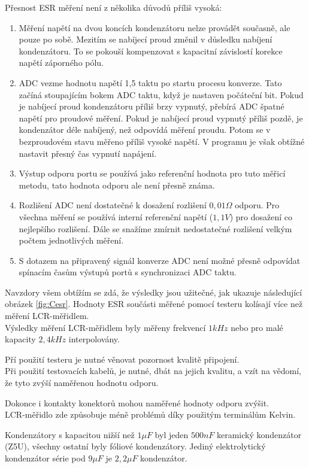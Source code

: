 Přesnost ESR měření není z několika důvodů příliš vysoká:
\begin{enumerate}
\item Měření napětí na dvou koncích kondenzátoru nelze provádět současně, ale pouze po sobě.
 Mezitím se nabíjecí proud změnil v důsledku nabíjení kondenzátoru.
To se pokouší kompenzovat s kapacitní závislostí korekce napětí záporného pólu.
\item  ADC vezme hodnotu napětí 1,5 taktu po startu procesu konverze. Tato začíná stoupajícím bokem ADC taktu, když je nastaven počáteční bit. Pokud je nabíjecí proud kondenzátoru příliš brzy vypnutý,
přebírá ADC špatné napětí pro proudové měření. Pokud je nabíjecí proud vypnutý příliš pozdě, je kondenzátor 
déle nabíjený, než odpovídá měření proudu. Potom se v bezproudovém stavu měřeno příliš vysoké napětí.
V programu je však obtížné nastavit přesný čas vypnutí napájení.
\item Výstup odporu portu se používá jako referenční hodnota pro tuto měřicí metodu, tato hodnota odporu
ale není přesně známa.
\item Rozlišení ADC není dostatečné k dosažení rozlišení \(0,01\Omega\) odporu.
Pro všechna měření se používá interní referenční napětí (\(1,1V\)) pro dosažení co nejlepšího rozlišení.
Dále se snažíme zmírnit nedostatečné rozlišení velkým počtem jednotlivých měření.
\item S dotazem na připravený signál konverze ADC není možné přesně odpovídat spínacím časům výstupů portů s
synchronizaci ADC taktu.
\end{enumerate}

 Navzdory všem obtížím se zdá, že výsledky jsou užitečné, jak ukazuje následující obrázek \ref{fig:Cesr}.
Hodnoty ESR součásti měřené pomocí testeru kolísají více než měření  LCR-měřidlem.\\
Výsledky měření LCR-měřidlem byly měřeny frekvencí \(1kHz\) nebo pro malé kapacity \(2,4kHz\) interpolovány.

Pří použití testeru je nutné věnovat pozornost kvalitě připojení.\\ Při použití testovacích kabelů,
je nutné, dbát na jejich kvalitu, a vzít na vědomí, že tyto zvýší naměřenou hodnotu odporu.

Dokonce i kontakty konektorů mohou naměřené hodnoty odporu zvýšit.\\
 LCR-měřidlo zde způsobuje méně problémů díky použitým terminálům Kelvin.
 
Kondenzátory s kapacitou nižší než \(1\mu F\) byl jeden \(500nF\) keramický kondenzátor (Z5U), všechny ostatní byly fóliové kondenzátory. Jediný elektrolytický kondenzátor série pod \(9\mu F\) je \(2,2\mu F\) kondenzátor.

